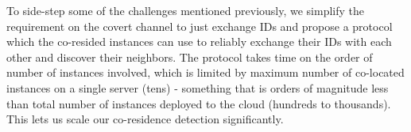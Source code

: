 To side-step some of the challenges mentioned previously, we simplify the requirement on 
the covert channel to just exchange IDs and propose a protocol which the co-resided 
instances can use to reliably exchange their IDs with each other and discover their neighbors. 
The protocol takes time on the order of number of instances involved, which is limited by 
maximum number of co-located instances on a single server (tens) - something that is orders 
of magnitude less than total number of instances deployed to the cloud (hundreds to thousands). 
This lets us scale our co-residence detection significantly. 

